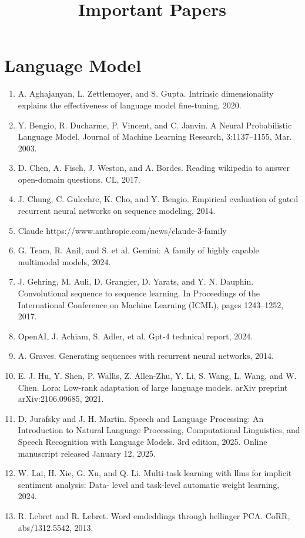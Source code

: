 \documentclass[]{article}
\title{Important Papers}
\author{}
\begin{document}
\maketitle
\section{Language Model}
\begin{enumerate}
\item A. Aghajanyan, L. Zettlemoyer, and S. Gupta. Intrinsic dimensionality explains the effectiveness of
language model fine-tuning, 2020.
\item Y. Bengio, R. Ducharme, P. Vincent, and C. Janvin. A Neural Probabilistic Language Model. Journal
of Machine Learning Research, 3:1137–1155, Mar. 2003.
\item D. Chen, A. Fisch, J. Weston, and A. Bordes. Reading wikipedia to answer open-domain questions.
CL, 2017.
\item J. Chung, C. Gulcehre, K. Cho, and Y. Bengio. Empirical evaluation of gated recurrent neural networks
on sequence modeling, 2014.
\item Claude https://www.anthropic.com/news/claude-3-family
\item G. Team, R. Anil, and S. et al. Gemini: A family of highly capable multimodal models, 2024.
\item J. Gehring, M. Auli, D. Grangier, D. Yarats, and Y. N. Dauphin. Convolutional sequence to sequence
learning. In Proceedings of the International Conference on Machine Learning (ICML), pages 1243–1252,
2017.
\item OpenAI, J. Achiam, S. Adler, et al. Gpt-4 technical report, 2024.
\item A. Graves. Generating sequences with recurrent neural networks, 2014.
\item E. J. Hu, Y. Shen, P. Wallis, Z. Allen-Zhu, Y. Li, S. Wang, L. Wang, and W. Chen. Lora: Low-rank
adaptation of large language models. arXiv preprint arXiv:2106.09685, 2021.
\item D. Jurafsky and J. H. Martin. Speech and Language Processing: An Introduction to Natural Language
Processing, Computational Linguistics, and Speech Recognition with Language Models. 3rd edition, 2025.
Online manuscript released January 12, 2025.
\item W. Lai, H. Xie, G. Xu, and Q. Li. Multi-task learning with llms for implicit sentiment analysis: Data-
level and task-level automatic weight learning, 2024.
\item R. Lebret and R. Lebret. Word emdeddings through hellinger PCA. CoRR, abs/1312.5542, 2013.

\end{enumerate}
\end{document}
